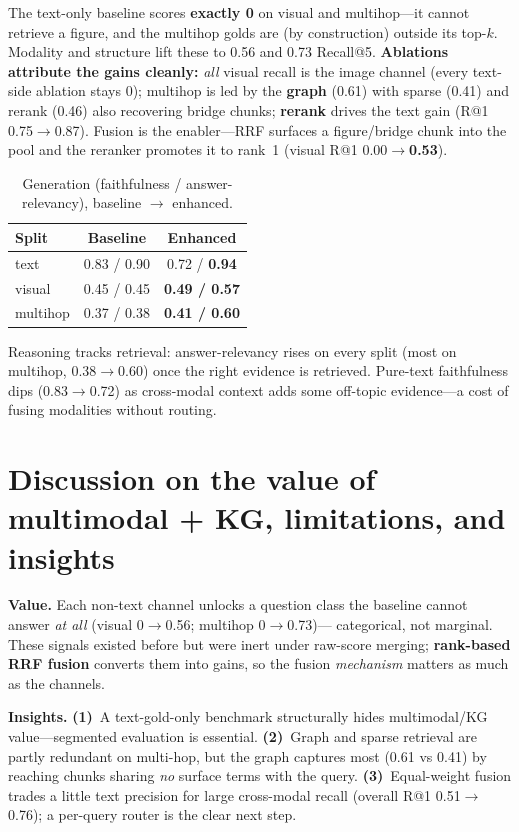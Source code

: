 \documentclass[10pt,oneside,a4paper]{article}
\begin{document}
The text-only baseline scores \textbf{exactly 0} on visual and multihop---it cannot
retrieve a figure, and the multihop golds are (by construction) outside its top-$k$.
Modality and structure lift these to 0.56 and 0.73 Recall@5. \textbf{Ablations
attribute the gains cleanly:} \emph{all} visual recall is the image channel (every
text-side ablation stays 0); multihop is led by the \textbf{graph} (0.61) with sparse
(0.41) and rerank (0.46) also recovering bridge chunks; \textbf{rerank} drives the
text gain (R@1 0.75$\rightarrow$0.87). Fusion is the enabler---RRF surfaces a
figure/bridge chunk into the pool and the reranker promotes it to rank~1 (visual R@1
0.00$\rightarrow$\textbf{0.53}).

\begin{table}[h]
  \centering
  \caption{Generation (faithfulness / answer-relevancy), baseline $\rightarrow$ enhanced.}
  \begin{tabular}{lcc}
    \toprule
    Split & Baseline & Enhanced \\
    \midrule
    text     & 0.83 / 0.90 & 0.72 / \textbf{0.94} \\
    visual   & 0.45 / 0.45 & \textbf{0.49 / 0.57} \\
    multihop & 0.37 / 0.38 & \textbf{0.41 / 0.60} \\
    \bottomrule
  \end{tabular}
\end{table}

Reasoning tracks retrieval: answer-relevancy rises on every split (most on multihop,
0.38$\rightarrow$0.60) once the right evidence is retrieved. Pure-text faithfulness
dips (0.83$\rightarrow$0.72) as cross-modal context adds some off-topic
evidence---a cost of fusing modalities without routing.

\section{Discussion on the value of multimodal + KG, limitations, and insights}

\textbf{Value.} Each non-text channel unlocks a question class the baseline cannot
answer \emph{at all} (visual 0$\rightarrow$0.56; multihop 0$\rightarrow$0.73)---%
categorical, not marginal. These signals existed before but were inert under
raw-score merging; \textbf{rank-based RRF fusion} converts them into gains, so the
fusion \emph{mechanism} matters as much as the channels.

\textbf{Insights.} \textbf{(1)}~A text-gold-only benchmark structurally hides multimodal/KG
value---segmented evaluation is essential. \textbf{(2)}~Graph and sparse retrieval are partly
redundant on multi-hop, but the graph captures most (0.61 vs 0.41) by reaching chunks
sharing \emph{no} surface terms with the query. \textbf{(3)}~Equal-weight fusion trades a
little text precision for large cross-modal recall (overall R@1
0.51$\rightarrow$0.76); a per-query router is the clear next step.
\end{document}
